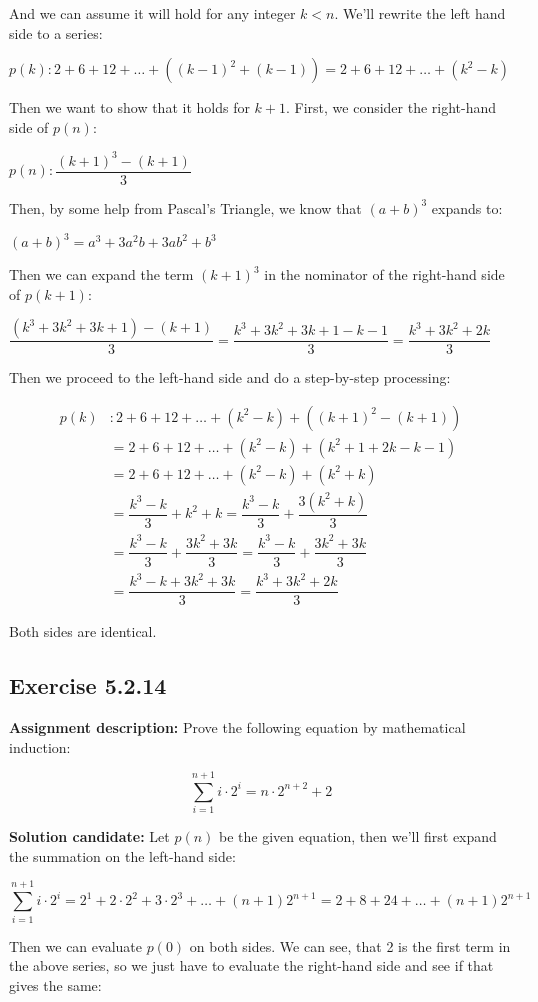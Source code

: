 \documentclass{report}
\newcommand{\cent}[1]{\begin{center}#1\end{center}}
\newcommand{\mAlign}[1]{\begin{align*}#1\end{align*}}
\newcommand{\assignmentDescription}{\textbf{Assignment description: }}
\newcommand{\solution}{\textbf{Solution candidate: }}
\newcommand{\QED}{\boxed{}}
\newcommand{\Exercise}[1]{\subsection{Exercise #1}}
\begin{document}
 	And we can assume it will hold for any integer $k<n$. We'll rewrite the left hand side to a series:
 	
 	\cent{$p(k) : 2+6+12+ \dots + ((k-1)^2+(k-1)) = 2+6+12+ \dots + (k^2-k)$}
 	
 	Then we want to show that it holds for $k+1$. First, we consider the right-hand side of $p(n)$:
 	
 	\cent{$p(n) :  \dfrac{(k+1)^3-(k+1)}{3}$}
 	
 	Then, by some help from Pascal's Triangle, we know that $(a+b)^3$ expands to:
 	\cent{$(a+b)^3 = a^3 + 3a^2b + 3ab^2 + b^3$}
 	
 	Then we can expand the term $(k+1)^3$ in the nominator of the right-hand side of $p(k+1)$:
 	
 	\cent{$ \dfrac{(k^3 + 3k^2 + 3k + 1) - (k+1)}{3} = \dfrac{k^3 + 3k^2 + 3k + 1 - k - 1}{3} = \dfrac{k^3 + 3k^2 + 2k}{3}$}
 	
 	Then we proceed to the left-hand side and do a step-by-step processing:
 	
 	\mAlign{
 		p(k) &:  2+6+12+ \dots + (k^2-k) + ((k+1)^2 -(k+1)) \\
 		&= 2+6+12+ \dots + (k^2-k) + (k^2+1+2k -k-1) \\
 		&= 2+6+12+ \dots + (k^2-k) + (k^2+k)\\
 		&= \dfrac{k^3-k}{3} + k^2+k = \dfrac{k^3-k}{3} + \dfrac{3(k^2+k)}{3} \\
 		&= \dfrac{k^3-k}{3} + \dfrac{3k^2 + 3k}{3} = \dfrac{k^3-k}{3} + \dfrac{3k^2 + 3k}{3} \\
 		&= \dfrac{k^3-k + 3k^2 + 3k}{3} = \dfrac{k^3 + 3k^2 + 2k}{3}
 	}
 	
 	Both sides are identical.\\
 	
 	\QED
 	\Exercise{5.2.14}
 	
 	\assignmentDescription
 	Prove the following equation by mathematical induction:
 	
 	\cent{$$\sum_{i=1}^{n+1} i\cdot 2^i= n \cdot 2^{n+2}+2 $$}
 	
 	\solution
 	Let $p(n)$ be the given equation, then we'll first expand the summation on the left-hand side:
 	 
 	\cent{$$\sum_{i=1}^{n+1} i\cdot 2^i = 2^1 + 2 \cdot 2^2 + 3 \cdot 2^3 + \dots + (n+1) 2^{n+1} = 2 + 8 + 24 + \dots + (n+1) 2^{n+1} $$}
 	
 	Then we can evaluate $p(0)$ on both sides. We can see, that 2 is the first term in the above series, so we just have to evaluate the right-hand side and see if that gives the same:
 	
\end{document}
